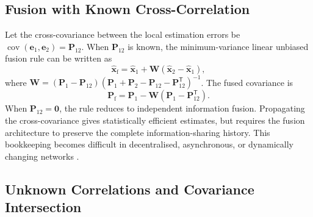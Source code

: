 \documentclass[11pt,oneside,openany]{book}
\begin{document}
\subsection{Fusion with Known Cross-Correlation}

Let the cross-covariance between the local estimation errors be $\operatorname{cov}(\mathbf{e}_{1},\mathbf{e}_{2})=\mathbf{P}_{12}$. When $\mathbf{P}_{12}$ is known, the minimum-variance linear unbiased
fusion rule can be written as
\begin{equation}
\widehat{\mathbf{x}}_{\mathrm{f}}=\widehat{\mathbf{x}}_{1}+\mathbf{W}\left(\widehat{\mathbf{x}}_{2}-\widehat{\mathbf{x}}_{1}\right),
\label{eq:correlated-track-fusion-state}
\end{equation}
where $\mathbf{W}=\left(\mathbf{P}_{1}-\mathbf{P}_{12}\right)\left(\mathbf{P}_{1}+\mathbf{P}_{2}-\mathbf{P}_{12}-\mathbf{P}_{12}^{\mathsf T}\right)^{-1}$. The fused covariance is
\begin{equation}
\mathbf{P}_{\mathrm{f}}=\mathbf{P}_{1}-\mathbf{W}\left(\mathbf{P}_{1}-\mathbf{P}_{12}^{\mathsf T}\right).
\label{eq:correlated-track-fusion-cov}
\end{equation}
When $\mathbf{P}_{12}=\mathbf{0}$, the rule reduces to independent
information fusion. Propagating the cross-covariance gives statistically
efficient estimates, but requires the fusion architecture to preserve the
complete information-sharing history. This bookkeeping becomes difficult
in decentralised, asynchronous, or dynamically changing networks
\cite{barshalom1995multitarget,saha1998track,
barshalom2011tracking}.

\subsection{Unknown Correlations and Covariance Intersection}
\end{document}
